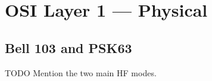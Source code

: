 \part{OSI Layer 1 --- Physical}






\chapter{Bell 103 and PSK63}

TODO Mention the two main HF modes. 

